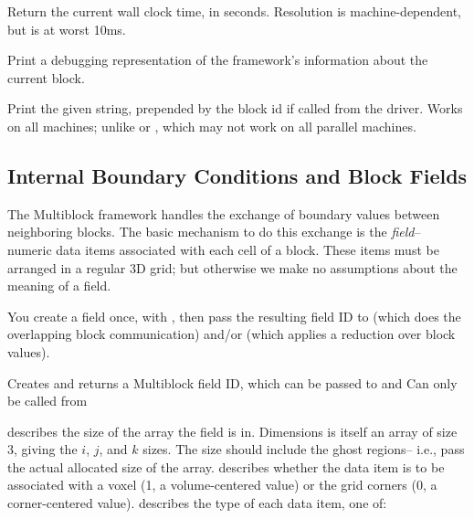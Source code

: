 \documentclass[10pt]{article}
\begin{document}
\vspace{0.2in}

Return the current wall clock time, in seconds.  Resolution is
     machine-dependent, but is at worst 10ms.

\vspace{0.2in}
Print a debugging representation of the framework's information
about the current block.

\vspace{0.2in}
     Print the given string, prepended by the block id if called from the 
     driver. Works on all machines; unlike  or
     , which may not work on all parallel machines.


\subsection{Internal Boundary Conditions and Block Fields}

The Multiblock framework handles the exchange of boundary values 
between neighboring blocks.
The basic mechanism to do this exchange is the {\em field}-- numeric data items 
associated with each cell of a block. These items must be arranged in a regular
3D grid; but otherwise we make no assumptions about the meaning of a
field.

You create a field once, with , then pass the resulting 
field ID to  (which does the
overlapping block communication) and/or  (which 
applies a reduction over block values).


\vspace{0.2in}
     Creates and returns a Multiblock field ID, which can be passed to
 and   Can only be called from

      describes the size of the array the field is in.
	Dimensions is itself an array of size 3, giving the $i$, $j$, and $k$ sizes.
	The size should include the ghost regions-- i.e., pass the actual allocated
	size of the array.
      describes whether the data item is to be associated with
	a voxel (1, a volume-centered value) or the grid corners (0, a corner-centered
	value). 
      describes the type of each data item, one of:
\end{document}
